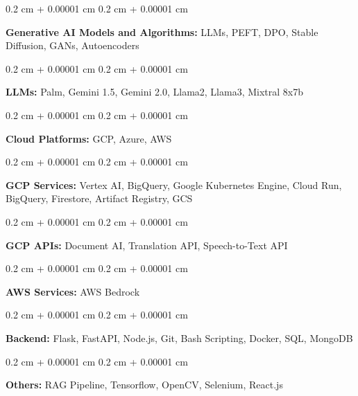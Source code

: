 \documentclass[10pt, letterpaper]{article}
\newenvironment{onecolentry}{
    \begin{adjustwidth}{
        0.2 cm + 0.00001 cm
    }{
        0.2 cm + 0.00001 cm
    }
}{
    \end{adjustwidth}
} %
\begin{document}
        \vspace{0.1 cm}
        \begin{onecolentry}
            \textbf{Generative AI Models and Algorithms:} LLMs, PEFT, DPO, Stable Diffusion, GANs, Autoencoders
        \end{onecolentry}
        \vspace{0.1 cm}
        \begin{onecolentry}
            \textbf{LLMs:} Palm, Gemini 1.5, Gemini 2.0, Llama2, Llama3, Mixtral 8x7b
        \end{onecolentry}
        \vspace{0.1 cm}
        \begin{onecolentry}
            \textbf{Cloud Platforms:} GCP, Azure, AWS
        \end{onecolentry}
        \vspace{0.1 cm}
        \begin{onecolentry}
            \textbf{GCP Services:} Vertex AI, BigQuery, Google Kubernetes Engine, Cloud Run, BigQuery, Firestore, Artifact Registry, GCS
        \end{onecolentry}
        \vspace{0.1 cm}
        \begin{onecolentry}
            \textbf{GCP APIs:} Document AI, Translation API, Speech-to-Text API
        \end{onecolentry}
        \vspace{0.1 cm}
        \begin{onecolentry}
            \textbf{AWS Services:} AWS Bedrock
        \end{onecolentry}
        \vspace{0.1 cm}
        \begin{onecolentry}
            \textbf{Backend:} Flask, FastAPI, Node.js, Git, Bash Scripting, Docker, SQL, MongoDB
        \end{onecolentry}
        \vspace{0.1 cm}
        \begin{onecolentry}
            \textbf{Others:} RAG Pipeline, Tensorflow, OpenCV, Selenium, React.js
        \end{onecolentry}

    \vspace{0.2 cm}
\end{document}
